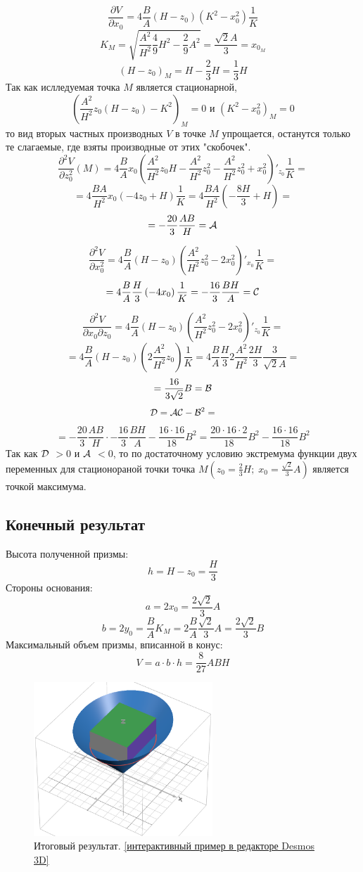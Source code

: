 $$
\frac{\partial V}{\partial x_0} = 4\frac{B}{A} (H-z_0) 
\left( 
K^2 - x_0^2
\right) \frac{1}{K}
$$
$$
K_M = \sqrt{\frac{A^2}{H^2} \frac{4}{9}H^2 - \frac{2}{9}A^2} = \frac{\sqrt{2}A}{3} = x_{0_M}
$$
$$
(H-z_0)_M = H - \frac{2}{3}H = \frac{1}{3}H
$$
Так как ислледуемая точка $M$ является стационарной,
$$
\left( 
\frac{A^2}{H^2}z_0 (H-z_0) - K^2
\right)_M = 0 \text{ и }
\left( 
K^2 - x_0^2
\right)_M = 0
$$
то вид вторых частных производных $V$ в точке $M$ упрощается, останутся только те слагаемые, где взяты производные от этих "скобочек".
$$
\frac{\partial^2 V}{\partial z_0^2} (M) = 4\frac{B}{A} x_0 
\left( 
\frac{A^2}{H^2}z_0H - \frac{A^2}{H^2}z_0^2 - \frac{A^2}{H^2} z_0^2 + x_0^2
\right)'_{z_0} \frac{1}{K} = 
$$
$$
= 4\frac{BA}{H^2} x_0 
\left( 
-4z_0 + H
\right)\frac{1}{K} =  
4\frac{BA}{H^2} 
\left( 
-\frac{8H}{3} + H
\right) = 
$$
$$
= -\frac{20}{3}\frac{AB}{H} = \cal A
$$


$$
\frac{\partial^2 V}{\partial x_0^2} = 4\frac{B}{A} (H-z_0) 
\left( 
\frac{A^2}{H^2}z_0^2 - 2x_0^2
\right)'_{x_0} \frac{1}{K} = 
$$
$$
= 4\frac{B}{A} \frac{H}{3} 
\left( 
 - 4x_0
\right) \frac{1}{K} = -\frac{16}{3}\frac{BH}{A} = \cal C
$$


$$
\frac{\partial^2 V}{\partial x_0 \partial z_0} = 4\frac{B}{A} (H-z_0) 
\left( 
\frac{A^2}{H^2}z_0^2 - 2x_0^2
\right)'_{z_0} \frac{1}{K} = 
$$
$$
= 4\frac{B}{A} (H-z_0) 
\left( 
2\frac{A^2}{H^2}z_0
\right) \frac{1}{K} = 
4\frac{B}{A} \frac{H}{3}
2\frac{A^2}{H^2} \frac{2H}{3}
 \frac{3}{\sqrt{2}A} =
$$
$$
= \frac{16}{3\sqrt{2}}B = \cal B
$$
$$
\cal D = \cal A \cal C - \cal B ^{\text{2}} = 
$$
$$
= -\frac{20}{3}\frac{AB}{H} \cdot -\frac{16}{3}\frac{BH}{A} - \frac{16 \cdot 16}{18}B^2 = \frac{20 \cdot 16 \cdot 2}{18}B^2 - \frac{16 \cdot 16}{18}B^2
$$
Так как $\cal D$ $> 0$ и $\cal A$ $< 0$, то по достаточному условию экстремума функции двух переменных для стационораной точки точка $M(z_0 = \frac{2}{3}H; \; x_0 = \frac{\sqrt{2}}{3}A)$ является точкой максимума.

\subsection{Конечный результат}
Высота полученной призмы:
$$
h = H - z_0 = \frac{H}{3}
$$
Стороны основания:
$$
a = 2x_0 = \frac{2\sqrt{2}}{3}A
$$
$$
b = 2y_0 = \frac{B}{A} K_M = 2 \frac{B}{A} \frac{\sqrt{2}}{3}A = \frac{2 \sqrt{2}}{3}B
$$
Максимальный объем призмы, вписанной в конус:
$$
V = a \cdot b \cdot h = \frac{8}{27}ABH
$$

\begin{figure}[H]
\centering
\includegraphics[width=0.6\textwidth]{img/res.png}
\caption{Итоговый результат. \href{https://www.desmos.com/3d/88d50f8402}{[интерактивный пример в редакторе Desmos 3D]}}
\end{figure}
